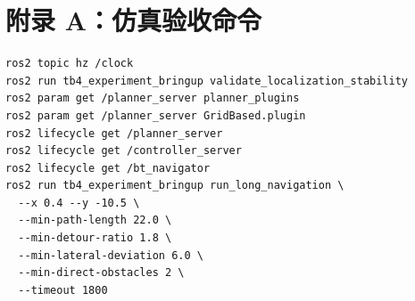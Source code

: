 \documentclass[12pt,a4paper]{ctexart}
\begin{document}
\appendix
\section*{附录 A：仿真验收命令}

\begin{verbatim}
ros2 topic hz /clock
ros2 run tb4_experiment_bringup validate_localization_stability
ros2 param get /planner_server planner_plugins
ros2 param get /planner_server GridBased.plugin
ros2 lifecycle get /planner_server
ros2 lifecycle get /controller_server
ros2 lifecycle get /bt_navigator
ros2 run tb4_experiment_bringup run_long_navigation \
  --x 0.4 --y -10.5 \
  --min-path-length 22.0 \
  --min-detour-ratio 1.8 \
  --min-lateral-deviation 6.0 \
  --min-direct-obstacles 2 \
  --timeout 1800
\end{verbatim}
\end{document}
